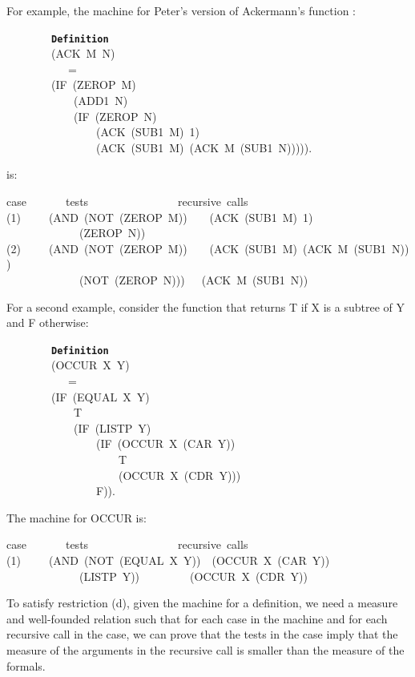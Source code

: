 \documentclass[11pt]{book}
\newenvironment{pubasis}{\begin{flushleft}\ttfamily\small}{\normalsize\rmfamily\end{flushleft}}
\newcommand{\axiomordefinition}[1]{\vspace{6pt}\texttt{\textbf{#1}}}
\begin{document}
For example, the machine for Peter's version of Ackermann's function \cite{PETER}:
\begin{pubasis}
~~~~~~~~\axiomordefinition{Definition}\\
~~~~~~~~(ACK~M~N)\\
~~~~~~~~~~~=\\
~~~~~~~~(IF~(ZEROP~M)\\
~~~~~~~~~~~~(ADD1~N)\\
~~~~~~~~~~~~(IF~(ZEROP~N)\\
~~~~~~~~~~~~~~~~(ACK~(SUB1~M)~1)\\
~~~~~~~~~~~~~~~~(ACK~(SUB1~M)~(ACK~M~(SUB1~N))))).\\
\end{pubasis}
is:
\begin{pubasis}
case~~~~~~~tests~~~~~~~~~~~~~~~~recursive~calls\\

(1)~~~~~(AND~(NOT~(ZEROP~M))~~~~(ACK~(SUB1~M)~1)\\
~~~~~~~~~~~~~(ZEROP~N))\\

(2)~~~~~(AND~(NOT~(ZEROP~M))~~~~(ACK~(SUB1~M)~(ACK~M~(SUB1~N)))\\
~~~~~~~~~~~~~(NOT~(ZEROP~N)))~~~(ACK~M~(SUB1~N))\\
\end{pubasis}
For a second example, consider the function that returns T if X is a
subtree of Y and F otherwise:
\begin{pubasis}
~~~~~~~~\axiomordefinition{Definition}\\
~~~~~~~~(OCCUR~X~Y)\\
~~~~~~~~~~~=\\
~~~~~~~~(IF~(EQUAL~X~Y)\\
~~~~~~~~~~~~T\\
~~~~~~~~~~~~(IF~(LISTP~Y)\\
~~~~~~~~~~~~~~~~(IF~(OCCUR~X~(CAR~Y))\\
~~~~~~~~~~~~~~~~~~~~T\\
~~~~~~~~~~~~~~~~~~~~(OCCUR~X~(CDR~Y)))\\
~~~~~~~~~~~~~~~~F)).\\
\end{pubasis}
The machine for OCCUR is:
\begin{pubasis}
case~~~~~~~tests~~~~~~~~~~~~~~~~recursive~calls\\

(1)~~~~~(AND~(NOT~(EQUAL~X~Y))~~(OCCUR~X~(CAR~Y))\\
~~~~~~~~~~~~~(LISTP~Y))~~~~~~~~~(OCCUR~X~(CDR~Y))\\
\end{pubasis}
To satisfy restriction (d), given the machine for a definition,
we need a measure and well-founded
relation such that for each case in the machine and for each recursive call in the case,
we can prove that the tests in the case imply that the measure of
the arguments in the recursive call is smaller than the measure of the
formals.
\end{document}
